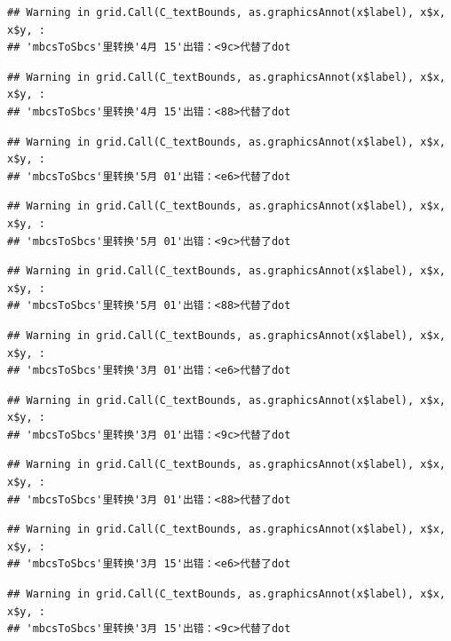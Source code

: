 \documentclass[
]{article}
\begin{document}
\begin{verbatim}
## Warning in grid.Call(C_textBounds, as.graphicsAnnot(x$label), x$x, x$y, :
## 'mbcsToSbcs'里转换'4月 15'出错：<9c>代替了dot
\end{verbatim}

\begin{verbatim}
## Warning in grid.Call(C_textBounds, as.graphicsAnnot(x$label), x$x, x$y, :
## 'mbcsToSbcs'里转换'4月 15'出错：<88>代替了dot
\end{verbatim}

\begin{verbatim}
## Warning in grid.Call(C_textBounds, as.graphicsAnnot(x$label), x$x, x$y, :
## 'mbcsToSbcs'里转换'5月 01'出错：<e6>代替了dot
\end{verbatim}

\begin{verbatim}
## Warning in grid.Call(C_textBounds, as.graphicsAnnot(x$label), x$x, x$y, :
## 'mbcsToSbcs'里转换'5月 01'出错：<9c>代替了dot
\end{verbatim}

\begin{verbatim}
## Warning in grid.Call(C_textBounds, as.graphicsAnnot(x$label), x$x, x$y, :
## 'mbcsToSbcs'里转换'5月 01'出错：<88>代替了dot
\end{verbatim}

\begin{verbatim}
## Warning in grid.Call(C_textBounds, as.graphicsAnnot(x$label), x$x, x$y, :
## 'mbcsToSbcs'里转换'3月 01'出错：<e6>代替了dot
\end{verbatim}

\begin{verbatim}
## Warning in grid.Call(C_textBounds, as.graphicsAnnot(x$label), x$x, x$y, :
## 'mbcsToSbcs'里转换'3月 01'出错：<9c>代替了dot
\end{verbatim}

\begin{verbatim}
## Warning in grid.Call(C_textBounds, as.graphicsAnnot(x$label), x$x, x$y, :
## 'mbcsToSbcs'里转换'3月 01'出错：<88>代替了dot
\end{verbatim}

\begin{verbatim}
## Warning in grid.Call(C_textBounds, as.graphicsAnnot(x$label), x$x, x$y, :
## 'mbcsToSbcs'里转换'3月 15'出错：<e6>代替了dot
\end{verbatim}

\begin{verbatim}
## Warning in grid.Call(C_textBounds, as.graphicsAnnot(x$label), x$x, x$y, :
## 'mbcsToSbcs'里转换'3月 15'出错：<9c>代替了dot
\end{verbatim}
\end{document}
